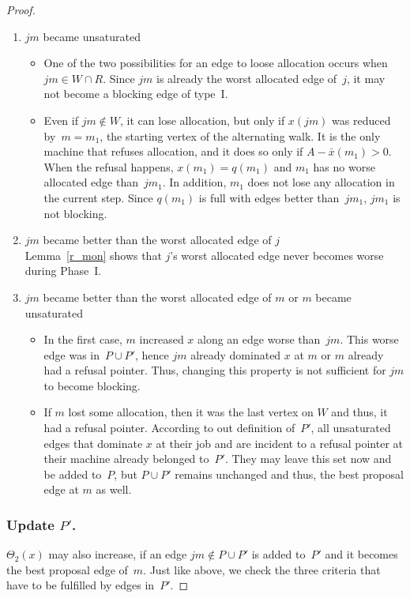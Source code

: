 \documentclass{llncs}
\begin{document}
\begin{proof}
\begin{enumerate}
	\item $jm$ became unsaturated
		\begin{itemize}
 			\item One of the two possibilities for an edge to loose allocation occurs when $jm \in W \cap R$. Since $jm$ is already the worst allocated edge of~$j$, it may not become a blocking edge of type~I.
			\item Even if $jm \notin W$, it can lose allocation, but only if $x(jm)$ was reduced by~$m = m_1$, the starting vertex of the alternating walk. It is the only machine that refuses allocation, and it does so only if $A - \bar{x}(m_1) > 0$. When the refusal happens, $x(m_1) = q(m_1)$ and $m_1$ has no worse allocated edge than~$jm_1$. In addition, $m_1$ does not lose any allocation in the current step. Since $q(m_1)$ is full with edges better than~$jm_1$, $jm_1$ is not blocking.
		\end{itemize}
	\item $jm$ became better than the worst allocated edge of $j$\\ Lemma~\ref{r_mon} shows that $j$'s worst allocated edge never becomes worse during Phase~I.
 	\item $jm$ became better than the worst allocated edge of $m$ or $m$ became unsaturated
		\begin{itemize}
			\item In the first case, $m$ increased $x$ along an edge worse than~$jm$. This worse edge was in~$P \cup P'$, hence $jm$ already dominated $x$ at $m$ or $m$ already had a refusal pointer. Thus, changing this property is not sufficient for $jm$ to become blocking.
			\item If $m$ lost some allocation, then it was the last vertex on $W$ and thus, it had a refusal pointer. According to out definition of~$P'$, all unsaturated edges that dominate $x$ at their job and are incident to a refusal pointer at their machine already belonged to~$P'$. They may leave this set now and be added to~$P$, but $P \cup P'$ remains unchanged and thus, the best proposal edge at $m$ as well.
		\end{itemize}
\end{enumerate}

\subsubsection*{Update $P'$.}

$\Theta_2(x)$ may also increase, if an edge $jm \notin P \cup P'$ is added to~$P'$ and it becomes the best proposal edge of~$m$. Just like above, we check the three criteria that have to be fulfilled by edges in~$P'$.


\end{proof}
\end{document}
